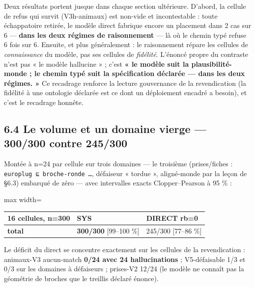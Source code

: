 \documentclass[11pt]{article}
\begin{document}
Deux résultats portent jusque dans chaque section ultérieure. D'abord, la cellule de refus qui survit (V3h-animaux) est non-vide et incontestable : toute échappatoire retirée, le modèle direct fabrique encore un placement dans 2 cas sur 6 — \textbf{dans les deux régimes de raisonnement} — là où le chemin typé refuse 6 fois sur 6. Ensuite, et plus généralement : le raisonnement répare les cellules de \emph{connaissance} du modèle, pas ses cellules de \emph{fidélité}. L'énoncé propre du contraste n'est pas « le modèle hallucine » ; c'est \textbf{« le modèle suit la plausibilité-monde ; le chemin typé suit la spécification déclarée — dans les deux régimes. »} Ce recadrage renforce la lecture gouvernance de la revendication (la fidélité à une ontologie déclarée est ce dont un déploiement encadré a besoin), et c'est le recadrage honnête.

\subsection*{6.4 Le volume et un domaine vierge — 300/300 contre 245/300}

Montée à n=24 par cellule sur trois domaines — le troisième (prises/fiches : \texttt{europlug ⊑ broche-ronde …}, défaiseur « tordue », aligné-monde par la leçon de §6.3) embarqué de zéro — avec intervalles exacts Clopper–Pearson à 95 \% :

\begin{center}\small\begin{adjustbox}{max width=\linewidth}\begin{tabular}{lll}\toprule
16 cellules, n=300 & SYS & DIRECT rb=0 \\ \midrule
\textbf{total} & \textbf{300/300} [99–100 \%] & 245/300 [77–86 \%] \\
\bottomrule\end{tabular}\end{adjustbox}\end{center}

Le déficit du direct se concentre exactement sur les cellules de la revendication : animaux-V3 aucun-match \textbf{0/24 avec 24 hallucinations} ; V5-défaisable 1/3 et 0/3 sur les domaines à défaiseurs ; prises-V2 12/24 (le modèle ne connaît pas la géométrie de broches que le treillis déclaré énonce).
\end{document}
